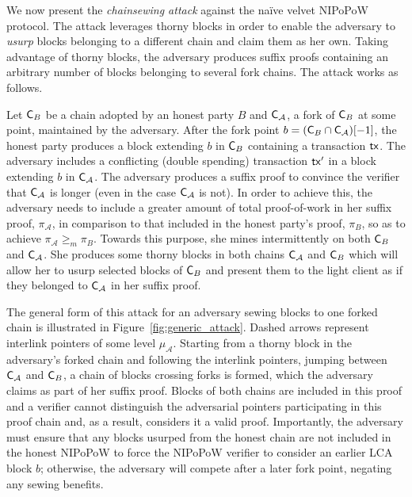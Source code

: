 We now present the \emph{chainsewing attack} against the na\"ive velvet NIPoPoW
protocol. The attack leverages thorny blocks in order to enable the adversary to
\emph{usurp} blocks belonging to a different chain and claim them as her own.
Taking advantage of thorny blocks, the adversary produces suffix proofs
containing an arbitrary number of blocks belonging to several fork chains. The
attack works as follows.

Let $\mathsf{C}_B$ be a chain adopted by an honest party $B$ and $\mathsf{C}_\mathcal{A}$, a fork of $\mathsf{C}_B$ at some point, maintained by the adversary. After the fork point $b = (\mathsf{C}_B \cap \mathsf{C}_\mathcal{A})[-1]$, the honest party produces a block extending $b$ in $\mathsf{C}_B$ containing a transaction $\mathsf{tx}$. The adversary includes a conflicting (double spending) transaction $\mathsf{tx}'$ in a block extending $b$ in $\mathsf{C}_\mathcal{A}$.
The adversary produces a suffix proof to convince the verifier that $\mathsf{C}_\mathcal{A}$ is longer (even in the case $\mathsf{C}_\mathcal{A}$ is not). In order to achieve this, the adversary needs to include a greater amount of total proof-of-work in her suffix proof, $\pi_\mathcal{A}$, in comparison to that included in the honest party's proof, $\pi_B$, so as to achieve $\pi_\mathcal{A} \geq_m \pi_B$. Towards this purpose, she mines intermittently on both $\mathsf{C}_B$ and $\mathsf{C}_\mathcal{A}$. She produces some thorny blocks in both chains $\mathsf{C}_\mathcal{A}$ and $\mathsf{C}_B$ which will allow her to usurp selected blocks of $\mathsf{C}_B$ and present them to the light client as if they belonged to $\mathsf{C}_\mathcal{A}$ in her suffix proof.

The general form of this attack for an adversary sewing blocks to one forked chain is illustrated in Figure~\ref{fig:generic_attack}. Dashed arrows represent interlink pointers of some level $\mu_\mathcal{A}$. Starting from a thorny block in the adversary's forked chain and following the interlink pointers, jumping between $\mathsf{C}_\mathcal{A}$ and $\mathsf{C}_B$, a chain of blocks crossing forks is formed, which the adversary claims as part of her suffix proof. Blocks of both chains are included in this proof and a verifier cannot distinguish the adversarial pointers participating in this proof chain and, as a result, considers it a valid proof. Importantly, the adversary must ensure that any blocks usurped from the honest chain are not included in the honest NIPoPoW to force the NIPoPoW verifier to consider an earlier LCA block $b$; otherwise, the adversary will compete after a later fork point, negating any sewing benefits.

